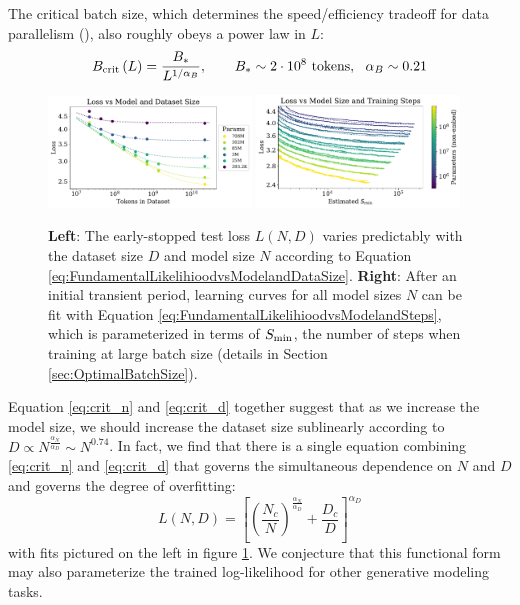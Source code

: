 \documentclass[english]{article}
\newcommand{\be}{\begin{equation}}
\newcommand{\ee}{\end{equation}}
\begin{document}
The critical batch size, which determines the speed/efficiency tradeoff for data parallelism (\cite{1812.06162}), also roughly obeys a power law in $L$:
\begin{equation}
B_{\rm crit}\left(L\right)=\frac{B_{\ast}}{L^{1/\alpha_{B}}},\qquad B_{\ast} \sim 2\cdot 10^8 \text{ tokens},\ \ \alpha_{B} \sim 0.21
\label{eq:critical-batch-size}
\end{equation}

\begin{figure}
\noindent \centering{} 
\includegraphics[width=0.48\textwidth]{LossvsModelDatasetSize}
\includegraphics[width=0.48\textwidth]{LearningCurveFitComparisonIntro}
\caption[Performance when varying model and data size, or model and training steps, simultaneously]{
{\bf Left}: The early-stopped test loss $L(N, D)$ varies predictably with the dataset size $D$ and model size $N$ according to Equation \eqref{eq:FundamentalLikelihioodvsModelandDataSize}.  
{\bf Right}:  After an initial transient period, learning curves for all model sizes $N$ can be fit with Equation \eqref{eq:FundamentalLikelihioodvsModelandSteps}, which is parameterized in terms of $S_{\rm min}$, the number of steps when training at large batch size (details in Section \ref{sec:OptimalBatchSize}).  \label{fig:LearningCurveFitsandResiduals}
\label{fig:LossvsModelDatasetSize}}
\end{figure}


Equation \eqref{eq:crit_n} and \eqref{eq:crit_d} together suggest that as we increase the model size, we should increase the dataset size sublinearly according to $D \propto N^{\frac{\alpha_N}{\alpha_D}} \sim N^{0.74}$. In fact, we find that there is a single equation combining \eqref{eq:crit_n} and \eqref{eq:crit_d} that governs the simultaneous dependence on $N$ and $D$ and governs the degree of overfitting:
\be
\label{eq:FundamentalLikelihioodvsModelandDataSize}
L(N, D) 
= \left[ \left( \frac{N_c}{N} \right)^{\frac{\alpha_N}{\alpha_D}} + \frac{D_c}{D}  \right]^{\alpha_D}
\ee
with fits pictured on the left in figure \ref{fig:LossvsModelDatasetSize}.  We conjecture that this functional form may also parameterize the trained log-likelihood for other generative modeling tasks.
\end{document}
